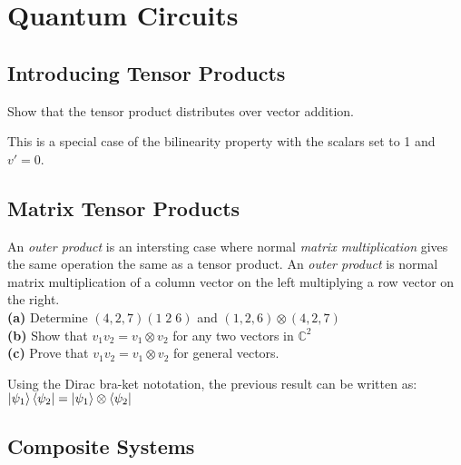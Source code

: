 
\chapter{Quantum Circuits}


\section{Introducing Tensor Products}

\begin{example}
Show that the tensor product distributes over vector addition.
\end{example}

This is a special case of the bilinearity property with 
the scalars set to 1 and $v' = 0$. 


\section{Matrix Tensor Products}

\begin{example}
An \textit{outer product} is an intersting case where normal \textit{matrix multiplication} 
gives the same operation the same as a tensor product. 
An \textit{outer product} is normal matrix multiplication of a column vector on the left multiplying 
a row vector on the right. \\
\textbf{(a)} Determine $(4,2,7)(1\; 2\; 6)$ and $(1,2,6) \otimes (4,2,7)$   \\ 
\textbf{(b)} Show that $v_1 v_2 = v_1 \otimes v_2$ for any two vectors in $\mathbb{C}^2$  \\ 
\textbf{(c)} Prove that $v_1 v_2 = v_1 \otimes v_2$ for general vectors.

\end{example}



\frmrule

Using the Dirac bra-ket nototation, the previous result can 
be written as: $\left|\psi_1\right\rangle\left\langle\psi_2\right| = \left|\psi_1\right\rangle \otimes \left\langle\psi_2\right|$

\section{Composite Systems}



